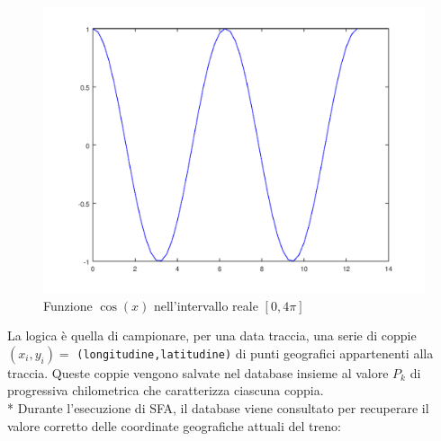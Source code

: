 \begin{figure}[h]
	\centering
	\includegraphics[width=\linewidth]{img/cos}
	\caption{Funzione $\cos(x)$ nell'intervallo reale $[0,4\pi]$}
	\label{fig:cos}
\end{figure}
La logica \`e quella di campionare, per una data traccia, una serie di coppie $(x_i,y_i) = $ \texttt{(longitudine,latitudine)} di punti geografici appartenenti alla traccia. Queste coppie vengono salvate nel database insieme al valore $P_k$ di progressiva chilometrica che caratterizza ciascuna coppia.\\*
Durante l'esecuzione di SFA, il database viene consultato per recuperare il valore corretto delle coordinate geografiche attuali del treno:
